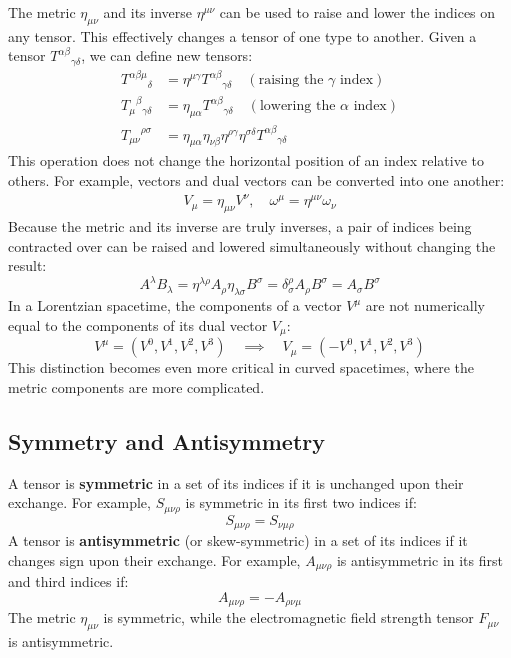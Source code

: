 \documentclass[11pt, a4paper]{report}
\begin{document}
The metric $\eta_{\mu\nu}$ and its inverse $\eta^{\mu\nu}$ can be used to raise and lower the indices on any tensor. This effectively changes a tensor of one type to another. Given a tensor ${T^{\alpha\beta}}_{\gamma\delta}$, we can define new tensors:
\begin{align}
    {T^{\alpha\beta\mu}}_\delta &= \eta^{\mu\gamma} {T^{\alpha\beta}}_{\gamma\delta} \quad (\text{raising the } \gamma \text{ index}) \\
    {T_\mu}^{\beta}{}_{\gamma\delta} &= \eta_{\mu\alpha} {T^{\alpha\beta}}_{\gamma\delta} \quad (\text{lowering the } \alpha \text{ index}) \\
    {T_{\mu\nu}}^{\rho\sigma} &= \eta_{\mu\alpha}\eta_{\nu\beta}\eta^{\rho\gamma}\eta^{\sigma\delta} {T^{\alpha\beta}}_{\gamma\delta}
\end{align}
This operation does not change the horizontal position of an index relative to others. For example, vectors and dual vectors can be converted into one another:
\begin{align}
    V_\mu = \eta_{\mu\nu}V^\nu, \quad \omega^\mu = \eta^{\mu\nu}\omega_\nu
\end{align}
Because the metric and its inverse are truly inverses, a pair of indices being contracted over can be raised and lowered simultaneously without changing the result:
\begin{equation}
    A^\lambda B_\lambda = \eta^{\lambda\rho}A_\rho \eta_{\lambda\sigma}B^\sigma = \delta^\rho_\sigma A_\rho B^\sigma = A_\sigma B^\sigma
\end{equation}
In a Lorentzian spacetime, the components of a vector $V^\mu$ are not numerically equal to the components of its dual vector $V_\mu$:
\begin{equation}
    V^\mu = (V^0, V^1, V^2, V^3) \quad \implies \quad V_\mu = (-V^0, V^1, V^2, V^3)
\end{equation}
This distinction becomes even more critical in curved spacetimes, where the metric components are more complicated.

\subsection*{Symmetry and Antisymmetry}

A tensor is \textbf{symmetric} in a set of its indices if it is unchanged upon their exchange. For example, $S_{\mu\nu\rho}$ is symmetric in its first two indices if:
\begin{equation}
    S_{\mu\nu\rho} = S_{\nu\mu\rho}
\end{equation}
A tensor is \textbf{antisymmetric} (or skew-symmetric) in a set of its indices if it changes sign upon their exchange. For example, $A_{\mu\nu\rho}$ is antisymmetric in its first and third indices if:
\begin{equation}
    A_{\mu\nu\rho} = -A_{\rho\nu\mu}
\end{equation}
The metric $\eta_{\mu\nu}$ is symmetric, while the electromagnetic field strength tensor $F_{\mu\nu}$ is antisymmetric.
\end{document}
